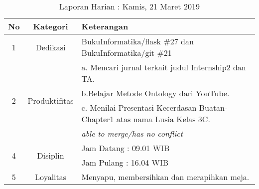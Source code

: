 \begin{table}[htp]
\begin{center}
\caption{Laporan Harian : Kamis, 21 Maret 2019}
\label{tab:lh210319}
\begin{tabularx}{\textwidth}{|l|l|X|}
\hline
\multicolumn{1}{|c|}{\textbf{No}} & \multicolumn{1}{c|}{\textbf{Kategori}} & \textbf{Keterangan} \\ \hline
\multicolumn{1}{|c|}{\multirow{1}{*}{1}} & \multicolumn{1}{c|}{\multirow{1}{*}{\parbox{2.5cm}{Dedikasi}}}
& BukuInformatika/flask \#27 dan BukuInformatika/git \#21 \\
\hline
\multicolumn{1}{|c|}{\multirow{4}{*}{2}} & \multicolumn{1}{c|}{\multirow{4}{*}{\parbox{2.5cm}{Produktifitas}}}
& a. Mencari jurnal terkait judul Internship2 dan TA.\\
\multicolumn{1}{|c|}{\multirow{1}{*}{}} & \multicolumn{1}{c|}{\multirow{1}{*}{\parbox{2.5cm}{}}}
& b.Belajar Metode Ontology dari YouTube.\\
\multicolumn{1}{|c|}{\multirow{1}{*}{}} & \multicolumn{1}{c|}{\multirow{1}{*}{\parbox{2.5cm}{}}}
& c. Menilai Presentasi Kecerdasan Buatan-Chapter1 atas nama Lusia Kelas 3C.\\
\hline
\multicolumn{1}{|c|}{\multirow{1}{*}{3}} & \multicolumn{1}{c|}{\multirow{1}{*}{\parbox{2.5cm}{Integritas}}}
& \textit{able to merge/has no conflict} \\
\hline
\multicolumn{1}{|c|}{\multirow{2}{*}{4}} & \multicolumn{1}{c|}{\multirow{2}{*}{\parbox{2.5cm}{Disiplin}}}
& Jam Datang : 09.01 WIB \\
\multicolumn{1}{|c|}{\multirow{1}{*}{}} & \multicolumn{1}{c|}{\multirow{1}{*}{\parbox{2.5cm}{}}}
& Jam Pulang : 16.04 WIB \\
\hline
\multicolumn{1}{|c|}{\multirow{2}{*}{5}} & \multicolumn{1}{c|}{\multirow{2}{*}{\parbox{2.5cm}{Loyalitas}}}
& Menyapu, membersihkan dan merapihkan meja.\\
\hline
\end{tabularx}
\end{center}
\end{table}

